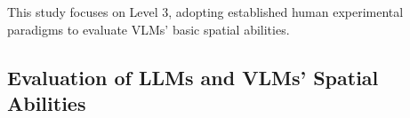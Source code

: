 This study focuses on Level 3, adopting established human experimental paradigms to evaluate VLMs' basic spatial abilities.




\subsection{Evaluation of LLMs and VLMs' Spatial Abilities}

